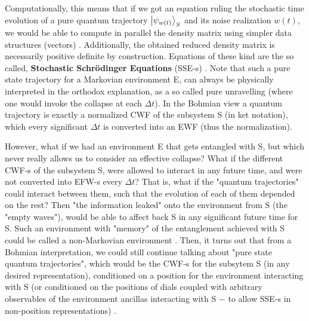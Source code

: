 \documentclass[11pt, a4paper]{article} %
\begin{document}
Computationally, this means that if we got an equation ruling the stochastic time evolution of a pure quantum trajectory $\ket{\psi_{w(t)}}_S$ and its noise realization $w(t)$, we would be able to compute in parallel the density matrix using simpler data structures (vectors) \cite{MarkovianityDefs, QuantumTrajs}. Additionally, the obtained reduced density matrix is necessarily positive definite by construction. Equations of these kind are the so called, {\bf Stochastic Schrödinger Equations} (SSE-s) \cite{Generalized, continousMeas}. Note that such a pure state trajectory for a Markovian environment E, can always be physically interpreted in the orthodox explanation, as a so called pure unravelling \cite{MarkovianityDefs} (where one would invoke the collapse at each $\Delta t$). In the Bohmian view a quantum trajectory is exactly a normalized CWF of the subsystem S (in ket notation), which every significant $\Delta t$ is converted into an EWF (thus the normalization).\vspace{-0.05cm}
 

However, what if we had an environment E that gets entangled with S, but which never really allows us to consider an effective collapse? What if the different CWF-s of the subsystem S, were allowed to interact in any future time, and were not converted into EFW-s every $\Delta t$? That is, what if the "quantum trajectories" could interact between them, such that the evolution of each of them depended on the rest? Then "the information leaked" onto the environment from S (the "empty waves"), would be able to affect back S in any significant future time for S. Such an environment with "memory" of the entanglement achieved with S could be called a non-Markovian environment \cite{MarkovianityDefs}. Then, it turns out that from a Bohmian interpretation, we could still continue talking about "pure state quantum trajectories", which would be the CWF-s for the subsytem S (in any desired representation), conditioned on a position for the environment interacting with S (or conditioned on the positions of dials coupled with arbitrary observables of the environment ancillas interacting with S $-$ to allow SSE-s in non-position representations) \cite{NMisModal, interpretSSE}. %
\vspace{-0.05cm}
\end{document}
